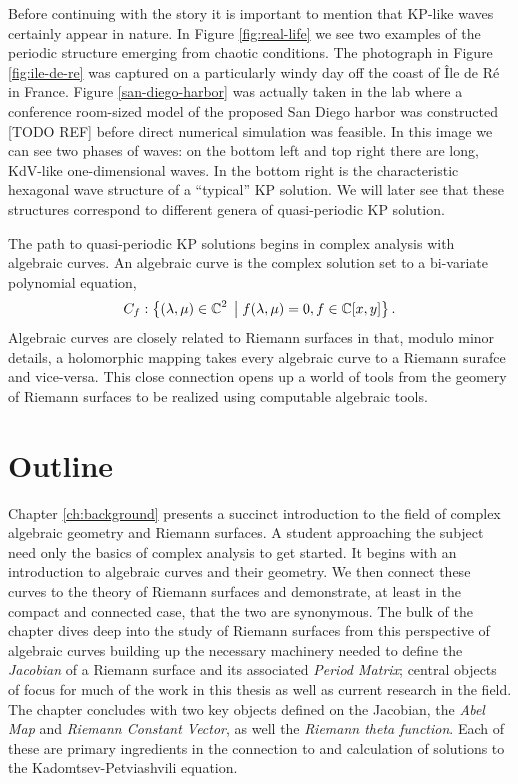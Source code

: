 Before continuing with the story it is important to mention that KP-like waves
certainly appear in nature. In Figure \ref{fig:real-life} we see two examples of
the periodic structure emerging from chaotic conditions. The photograph in
Figure \ref{fig:ile-de-re} was captured on a particularly windy day off the
coast of \^{I}le de R\'{e} in France. Figure \ref{san-diego-harbor} was actually
taken in the lab where a conference room-sized model of the proposed San Diego
harbor was constructed [TODO REF] before direct numerical simulation was
feasible. In this image we can see two phases of waves: on the bottom left and
top right there are long, KdV-like one-dimensional waves. In the bottom right is
the characteristic hexagonal wave structure of a ``typical'' KP solution. We
will later see that these structures correspond to different genera of
quasi-periodic KP solution.

The path to quasi-periodic KP solutions begins in complex analysis with
algebraic curves. An algebraic curve is the complex solution set to a bi-variate
polynomial equation,
\begin{equation}
  C_f: \left\{
    (\lambda, \mu) \in \operatorname{\mathbb{C}}^2
    \; \big| \;
    f(\lambda, \mu) = 0, f \in \operatorname{\mathbb{C}}[x,y]
  \right\}.
\end{equation}
Algebraic curves are closely related to Riemann surfaces in that, modulo minor
details, a holomorphic mapping takes every algebraic curve to a Riemann surafce
and vice-versa. This close connection opens up a world of tools from the geomery
of Riemann surfaces to be realized using computable algebraic tools.


\section{Outline} \label{sec:outline}

Chapter \ref{ch:background} presents a succinct introduction to the field of
complex algebraic geometry and Riemann surfaces. A student approaching the
subject need only the basics of complex analysis to get started. It begins with
an introduction to algebraic curves and their geometry. We then connect these
curves to the theory of Riemann surfaces and demonstrate, at least in the
compact and connected case, that the two are synonymous. The bulk of the chapter
dives deep into the study of Riemann surfaces from this perspective of algebraic
curves building up the necessary machinery needed to define the {\it Jacobian}
of a Riemann surface and its associated {\it Period Matrix}; central objects of
focus for much of the work in this thesis as well as current research in the
field. The chapter concludes with two key objects defined on the Jacobian, the
{\it Abel Map} and {\it Riemann Constant Vector}, as well the {\it Riemann theta
  function}. Each of these are primary ingredients in the connection to and
calculation of solutions to the Kadomtsev-Petviashvili equation.

